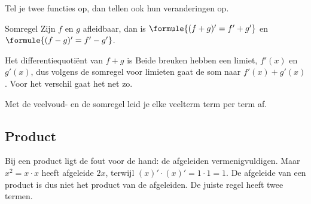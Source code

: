 Tel je twee functies op, dan tellen ook hun veranderingen op.

\begin{theorie}
\begin{stelling}{Somregel}
Zijn $f$ en $g$ afleidbaar, dan is \quad $\formule{(f + g)' = f' + g'}$ \quad en \quad $\formule{(f - g)' = f' - g'}$.
\end{stelling}
\begin{bewijs}
Het differentiequotiënt van $f + g$ is
Beide breuken hebben een limiet, $f'(x)$ en $g'(x)$, dus volgens de somregel voor limieten gaat de som naar $f'(x) + g'(x)$. Voor het verschil gaat het net zo.
\end{bewijs}
\end{theorie}

Met de veelvoud- en de somregel leid je elke veelterm term per term af.


\begin{oefeningen}
\end{oefeningen}

\subsection{Product}

Bij een product ligt de fout voor de hand: de afgeleiden vermenigvuldigen. Maar $x^2 = x \cdot x$ heeft afgeleide $2x$, terwijl $(x)' \cdot (x)' = 1 \cdot 1 = 1$. De afgeleide van een product is dus niet het product van de afgeleiden. De juiste regel heeft twee termen.

